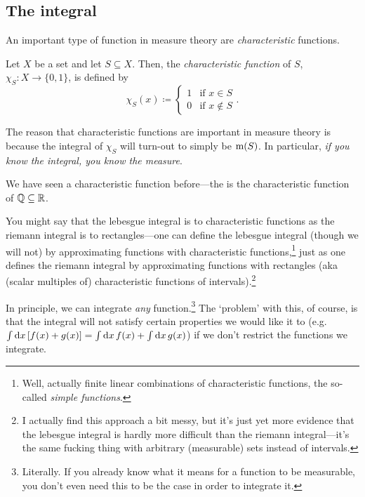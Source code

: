 \subsection{The integral}

An important type of function in measure theory are \emph{characteristic} functions.
\begin{dfn}
Let $X$ be a set and let $S\subseteq X$.  Then, the \emph{characteristic function} of $S$, $\chi _S:X\rightarrow \{ 0,1\}$, is defined by
\begin{equation}
\chi _S(x)\coloneqq \begin{cases}1 & \text{if }x\in S \\ 0 & \text{if }x\notin S\end{cases}.
\end{equation}
\begin{rmk}
The reason that characteristic functions are important in measure theory is because the integral of $\chi _S$ will turn-out to simply be $\mathrm{m} (S)$.  In particular, \emph{if you know the integral, you know the measure}.
\end{rmk}
\begin{rmk}
We have seen a characteristic function before---the  is the characteristic function of $\mathbb{Q} \subseteq \mathbb{R}$.
\end{rmk}
\begin{rmk}
You might say that the lebesgue integral is to characteristic functions as the riemann integral is to rectangles---one can define the lebesgue integral (though we will not) by approximating functions with characteristic functions,\footnote{Well, actually finite linear combinations of characteristic functions, the so-called \emph{simple functions}.} just as one defines the riemann integral by approximating functions with rectangles (aka (scalar multiples of) characteristic functions of intervals).\footnote{I actually find this approach a bit messy, but it's just yet more evidence that the lebesgue integral is hardly more difficult than the riemann integral---it's the same fucking thing with arbitrary (measurable) sets instead of intervals.}
\end{rmk}
\end{dfn}
In principle, we can integrate \emph{any} function.\footnote{Literally.  If you already know what it means for a function to be measurable, you don't even need this to be the case in order to integrate it.}  The `problem' with this, of course, is that the integral will not satisfy certain properties we would like it to (e.g.~$\int \mathop{}\!\mathrm{d} x\, [f(x)+g(x)]=\int \mathop{}\!\mathrm{d} x\, f(x)+\int \mathop{}\!\mathrm{d} x\, g(x)$) if we don't restrict the functions we integrate.
